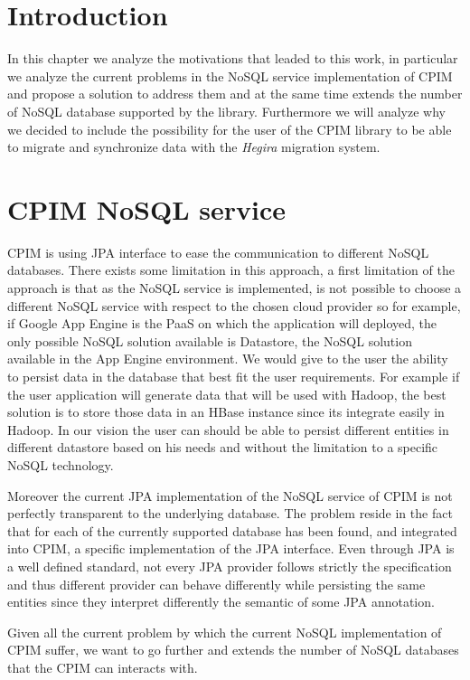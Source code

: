\section{Introduction}
In this chapter we analyze the motivations that leaded to this work, in particular we analyze the current problems in the NoSQL service implementation of CPIM and propose a solution to address them and at the same time extends the number of NoSQL database supported by the library.
\noindent Furthermore we will analyze why we decided to include the possibility for the user of the CPIM library to be able to migrate and synchronize data with the \textit{Hegira} migration system.

\section{CPIM NoSQL service}
CPIM is using JPA interface to ease the communication to different NoSQL databases. There exists some limitation in this approach, a first limitation of the approach is that as the NoSQL service is implemented, is not possible to choose a different NoSQL service with respect to the chosen cloud provider so for example, if Google App Engine is the PaaS on which the application will deployed, the only possible NoSQL solution available is Datastore, the NoSQL solution available in the App Engine environment.
We would give to the user the ability to persist data in the database that best fit the user requirements. For example if the user application will generate data that will be used with Hadoop, the best solution is to store those data in an HBase instance since its integrate easily in Hadoop.
In our vision the user can should be able to persist different entities in different datastore based on his needs and without the limitation to a specific NoSQL technology.

\noindent Moreover the current JPA implementation of the NoSQL service of CPIM is not perfectly transparent to the underlying database. The problem reside in the fact that for each of the currently supported database has been found, and integrated into CPIM, a specific implementation of the JPA interface. Even through JPA is a well defined standard, not every JPA provider follows strictly the specification and thus different provider can behave differently while persisting the same entities since they interpret differently the semantic of some JPA annotation.

\newparagraph Given all the current problem by which the current NoSQL implementation of CPIM suffer, we want to go further and extends the number of NoSQL databases that the CPIM can interacts with.

